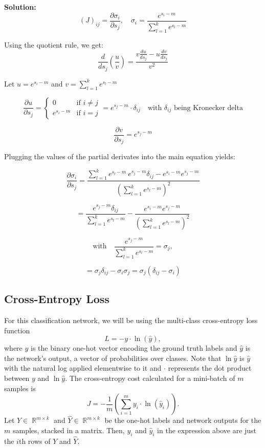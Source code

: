 \documentclass{article}
\DeclareMathOperator{\R}{\mathbb{R}}
\newenvironment{solution}{\color{blue} \smallskip \textbf{Solution:}}{}
\begin{document}
\begin{solution}
    \begin{equation}
    (J)_{ij} = \frac{\partial \sigma_i}{\partial s_j}, \quad \sigma_i = \frac{e^{s_i - m}}{\sum_{l=1}^k e^{s_l - m}}
\end{equation}

Using the quotient rule, we get:
\[
\frac{d}{ds_j} \left( \frac{u}{v} \right) = \frac{v \frac{du}{ds_j} - u \frac{dv}{ds_j}}{v^2}
\]

Let \( u = e^{s_i - m} \) and \( v = \sum_{l=1}^k e^{s_l - m} \)

\[
\frac{\partial u}{\partial s_j} = \begin{cases} 
    0 & \text{if } i \neq j \\
    e^{s_i - m} & \text{if } i = j
\end{cases} = e^{s_j - m} \cdot \delta_{ij} \quad \text{with } \delta_{ij} \text{ being Kronecker delta}
\]

\[
\frac{\partial v}{\partial s_j} = e^{s_j - m}
\]

Plugging the values of the partial derivates into the main equation yields:

\[
\frac{\partial \sigma_i}{\partial s_j} = \frac{\sum_{l=1}^k e^{s_l - m} \ e^{s_j - m} \delta_{ij} - e^{s_i - m} e^{s_j - m}}{ \left( \sum_{l=1}^k e^{s_l - m} \right)^2}
\]

\[
= \frac{e^{s_j - m} \delta_{ij}}{\sum_{l=1}^k e^{s_l - m}} - \frac{e^{s_i - m} e^{s_j - m}}{\left( \sum_{l=1}^k e^{s_l - m} \right)^2}
\]

\[
\text{with} \quad  \frac{e^{s_j - m}}{\sum_{l=1}^k e^{s_l - m}} = \sigma_j,
\]

\[
= \sigma_j \delta_{ij} - \sigma_i \sigma_j = \sigma_j (\delta_{ij} - \sigma_i)
\]
\end{solution}

\newpage
\subsection{Cross-Entropy Loss}
For this classification network, we will be using the multi-class cross-entropy loss function
\[
    L = -y \cdot \ln{(\hat{y})},
\]
where $y$ is the binary one-hot vector encoding the ground truth labels and $\hat{y}$ is the network's output, a vector of probabilities over classes. 
Note that $\ln\hat{y}$ is $\hat{y}$ with the natural log applied elementwise to it and $\cdot$ represents the dot product between $y$ and $\ln\hat{y}$. 
The cross-entropy cost calculated for a mini-batch of $m$ samples is
\[
    J = -\frac{1}{m}\left(\sum_{i=1}^m y_i \cdot \ln{(\hat{y}_i)}\right).
\]
Let $Y \in \R^{m \times k}$ and $\hat{Y} \in \R^{m \times k}$ be the one-hot labels and network outputs for the $m$ samples, stacked in a matrix. 
Then, $y_i$ and $\hat{y}_i$ in the expression above are just the $i$th rows of $Y$ and $\hat{Y}$.
\end{document}
